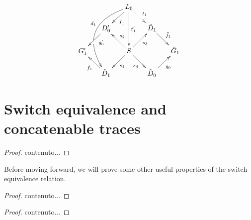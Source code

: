 \[\xymatrix@R=15pt@C=15pt{&&L_ 0\ar[dl]^{I_1} \ar@/_1.2cm/[dddl]_(.4){d_1}|(.63)\hole\ar[dd]^{t'_1} \ar@{.>}[dr]^{t_1}\\&D'_0 \ar[dl]^(.4){g'_0}&&\tilde{D}_1 \ar[dr]^{\tilde{f}_1}\\G'_1 && S\ar[dr]_{s_4} \ar[ur]_{s_3}\ar[dl]^{s_1} \ar[ul]_{s_2}&&\hat{G}_1\\& \hat{D}_1 \ar[ul]^{\hat{f}_1}&&\hat{D}_0 \ar[ur]_{\hat{g}_0}}\]

\section{Switch equivalence and concatenable traces}

\begin{lemma}
\end{lemma}
\begin{proof}
	contenuto...
\end{proof}
\begin{definition}
\end{definition}

Before moving forward, we will prove some other useful properties of the switch equivalence relation.

\begin{lemma}
\end{lemma}
\begin{proof}
	contenuto...
\end{proof}


\begin{theorem}
\end{theorem}
\begin{proof}
	contenuto...
\end{proof}


